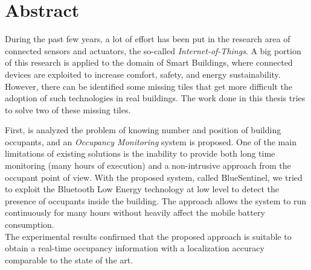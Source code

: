 %
\cleardoublepage
%
{}
%
%
%
\chapter*{Abstract}
%
During the past few years, a lot of effort has been put in the research area of connected sensors and actuators, the so-called \emph{Internet-of-Things}. A big portion of this research is applied to the domain of Smart Buildings, where connected devices are exploited to increase comfort, safety, and energy sustainability.
However, there can be identified some missing tiles that get more difficult the adoption of such technologies in real buildings.
The work done in this thesis tries to solve two of these missing tiles.

First, is analyzed the problem of knowing number and position of building occupants, and an \emph{Occupancy Monitoring} system is proposed. One of the main limitations of existing solutions is the inability to provide both long time monitoring (many hours of execution) and a non-intrusive approach from the occupant point of view.
With the proposed system, called BlueSentinel, we tried to exploit the Bluetooth Low Energy technology at low level to detect the presence of occupants inside the building. The approach allows the system to run continuously for many hours without heavily affect the mobile battery consumption.\\
The experimental results confirmed that the proposed approach is suitable to obtain a real-time occupancy information with a localization accuracy comparable to the state of the art.

